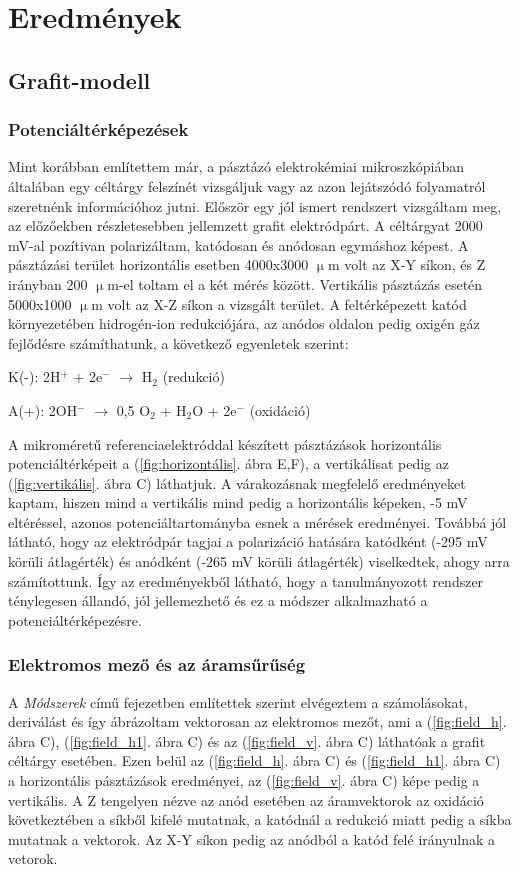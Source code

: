 \chapter{Eredmények}
\pagestyle{headings}

\section{Grafit-modell}
\subsection{Potenciáltérképezések}
Mint korábban említettem már, a pásztázó elektrokémiai mikroszkópiában általában egy céltárgy felszínét vizsgáljuk vagy az azon lejátszódó folyamatról szeretnénk információhoz jutni. Először egy jól ismert rendszert vizsgáltam meg, az előzőekben részletesebben jellemzett grafit elektródpárt. A céltárgyat 2000 mV-al pozítivan polarizáltam, katódosan és anódosan egymáshoz képest. A pásztázási terület horizontális esetben 4000x3000 $\upmu$m volt az X-Y síkon, és Z irányban 200 $\upmu$m-el toltam el a két mérés között. Vertikális pásztázás esetén 5000x1000 $\upmu$m volt az X-Z síkon a vizsgált terület. A feltérképezett katód környezetében hidrogén-ion redukciójára, az anódos oldalon pedig oxigén gáz fejlődésre számíthatunk, a következő egyenletek szerint:

K(-): 2H$^+$ + 2e$^-$ $\longrightarrow$ H$_2$ (redukció)

A(+):  2OH$^-$ $\longrightarrow$ 0,5 O$_2$ + H$_2$O + 2e$^-$ (oxidáció)

A mikroméretű referenciaelektróddal készített pásztázások horizontális potenciáltérképeit a (\ref{fig:horizontális}. ábra E,F), a vertikálisat pedig az (\ref{fig:vertikális}. ábra C) láthatjuk. A várakozásnak megfelelő eredményeket kaptam, hiszen mind a vertikális mind pedig a horizontális képeken, -5 mV eltéréssel, azonos potenciáltartományba esnek a mérések eredményei. Továbbá jól látható, hogy az elektródpár tagjai a polarizáció hatására katódként (-295 mV körüli átlagérték) és anódként (-265 mV körüli átlagérték) viselkedtek, ahogy arra számítottunk. Így az eredményekből látható, hogy a tanulmányozott rendszer ténylegesen állandó, jól jellemezhető és ez a módszer alkalmazható a potenciáltérképezésre. 

\subsection{Elektromos mező és az áramsűrűség}
A \emph{Módszerek} című fejezetben említettek szerint elvégeztem a számolásokat, deriválást és így ábrázoltam vektorosan az elektromos mezőt, ami a (\ref{fig:field_h}. ábra C), (\ref{fig:field_h1}. ábra C) és az (\ref{fig:field_v}. ábra C) láthatóak a grafit céltárgy esetében. Ezen belül az (\ref{fig:field_h}. ábra C) és (\ref{fig:field_h1}. ábra C) a horizontális pásztázások eredményei, az (\ref{fig:field_v}. ábra C) képe pedig a vertikális. A Z tengelyen nézve az anód esetében az áramvektorok az oxidáció következtében a síkből kifelé mutatnak, a katódnál a redukció miatt pedig a síkba mutatnak a vektorok. Az X-Y síkon pedig az anódból a katód felé irányulnak a vetorok.  

